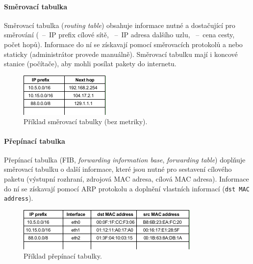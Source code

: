 \paragraph*{Směrovací tabulka} Směrovací tabulka (\textit{routing table}) obsahuje informace nutné a dostačující pro směrování (~--~IP prefix cílové sítě, ~--~IP adresa dalšího uzlu, ~--~cena cesty, počet hopů). Informace do ní se získavají pomocí směrovacích protokolů a nebo staticky (administrátor provede manuálně). Směrovací tabulku mají i koncové stanice (počítače), aby mohli posílat pakety do internetu.

\begin{figure}[H]
    \centering
    \includegraphics[width=0.4\linewidth]{smerovaci_tabulka.pdf}
    \caption{Příklad směrovací tabulky (bez metriky).}
\end{figure}

\paragraph*{Přepínací tabulka} Přepínací tabulka (FIB, \textit{forwarding information base}, \textit{forwarding table}) doplňuje směrovací tabulku o další informace, které jsou nutné pro sestavení cílového paketu (výstupní rozhraní, zdrojová MAC adresa, cílová MAC adresa). Informace do ní se získavají pomocí ARP protokolu a doplnění vlastních informací (\texttt{dst MAC address}).

\begin{figure}[H]
    \centering
    \includegraphics[width=0.9\linewidth]{prepinaci_tabulka.pdf}
    \caption{Příklad přepínací tabulky.}
\end{figure}

